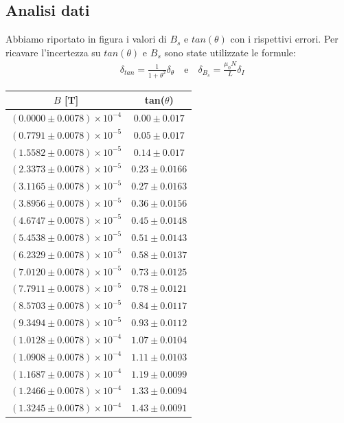 \documentclass[a4paper]{article}
\begin{document}
\subsection{Analisi dati}
Abbiamo riportato in figura i valori di \( \mathit{B_s} \) e \( \mathit{tan(\theta)} \) con i rispettivi errori.
Per ricavare l'incertezza su \( \mathit{tan(\theta)} \) e \( \mathit{B_s} \) sono state utilizzate le formule:
\begin{align*}
	 & \delta_{tan} = \frac {1}{1+\theta^2}\delta_\theta \quad \text{e} \quad \delta_{B_s} = \frac {\mu_0N}{L}\delta_I
\end{align*}

\begin{center}
\begin{tabular}{|c|c|}
\hline
$B$ [T] & tan($\theta$) \\
\hline
$(0.0000 \pm 0.0078) \times 10^{-4}$ & $0.00 \pm 0.017$ \\
$(0.7791 \pm 0.0078) \times 10^{-5}$ & $0.05 \pm 0.017$ \\
$(1.5582 \pm 0.0078) \times 10^{-5}$ & $0.14 \pm 0.017$ \\
$(2.3373 \pm 0.0078) \times 10^{-5}$ & $0.23 \pm 0.0166$ \\
$(3.1165 \pm 0.0078) \times 10^{-5}$ & $0.27 \pm 0.0163$ \\
$(3.8956 \pm 0.0078) \times 10^{-5}$ & $0.36 \pm 0.0156$ \\
$(4.6747 \pm 0.0078) \times 10^{-5}$ & $0.45 \pm 0.0148$ \\
$(5.4538 \pm 0.0078) \times 10^{-5}$ & $0.51 \pm 0.0143$ \\
$(6.2329 \pm 0.0078) \times 10^{-5}$ & $0.58 \pm 0.0137$ \\
$(7.0120 \pm 0.0078) \times 10^{-5}$ & $0.73 \pm 0.0125$ \\
$(7.7911 \pm 0.0078) \times 10^{-5}$ & $0.78 \pm 0.0121$ \\
$(8.5703 \pm 0.0078) \times 10^{-5}$ & $0.84 \pm 0.0117$ \\
$(9.3494 \pm 0.0078) \times 10^{-5}$ & $0.93 \pm 0.0112$ \\
$(1.0128 \pm 0.0078) \times 10^{-4}$ & $1.07 \pm 0.0104$ \\
$(1.0908 \pm 0.0078) \times 10^{-4}$ & $1.11 \pm 0.0103$ \\
$(1.1687 \pm 0.0078) \times 10^{-4}$ & $1.19 \pm 0.0099$ \\
$(1.2466 \pm 0.0078) \times 10^{-4}$ & $1.33 \pm 0.0094$ \\
$(1.3245 \pm 0.0078) \times 10^{-4}$ & $1.43 \pm 0.0091$ \\

\end{tabular}
\end{center}
\end{document}
